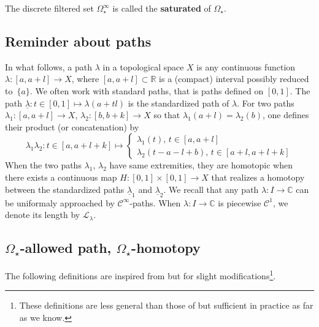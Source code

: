 \documentclass[11pt, english]{smfart}
\theoremstyle{definition}
\begin{document}
\begin{defi}
The discrete filtered set $\Omega_\star^\infty$ is called the
\textbf{saturated} of $\Omega_\star$.
\end{defi}

\subsection{Reminder about paths}

In what follows, a path $\lambda$ in a topological space $X$ is any
continuous function $\lambda: [a,a+l] \to X$, where $[a,a+l] \subset
\mathbb{R}$ is a (compact) interval possibly 
reduced to~$\{a\}$. We often work with standard
paths, that is paths
defined on $[0,1]$. The path  ${ \underline{\lambda} : t \in [0,1] \mapsto
\lambda(a+tl)}$ is the standardized path
of  $\lambda$. For  two paths 
$\lambda_1: [a,a+l] 
\to X$, $\lambda_2: [b,b+k] \to X$ so that
$\lambda_1(a+l)=\lambda_2(b)$, one defines their product (or
concatenation) by 
$${ \displaystyle \lambda_1 \lambda_2 : t \in [a,a+l+k]\mapsto 
\left\{
\begin{array}{l}
\lambda_1(t), \, t \in [a,a+l]\\
\lambda_2(t-a-l+b), \, t \in [a+l,a+l+k]
\end{array}
\right.} 
$$
 When the two paths $\lambda_1$, $\lambda_2$ have same extremities,
they are homotopic when there exists a continuous map $H : [0,1]\times
[0,1] \to X$ that realizes a homotopy between the standardized
paths
$\underline{\lambda}_1$ and $\underline{\lambda}_2$.
We recall that any path  $\lambda:I \to \mathbb{C}$
can be uniformaly approached by $\mathcal{C}^\infty$-paths.
When $\lambda : I \to \mathbb{C}$ is piecewise $\mathcal{C}^1$, we denote its 
length by 
${ \displaystyle \mathcal{L}_\lambda  }$.

\subsection{$\Omega_\star$-allowed path, $\Omega_\star$-homotopy}

The following definitions are inspired from  \cite{CNP1} but for
slight modifications\footnote{These definitions are less general than
  those of  \cite{CNP1} but sufficient in practice as far as we know.}.
\end{document}
